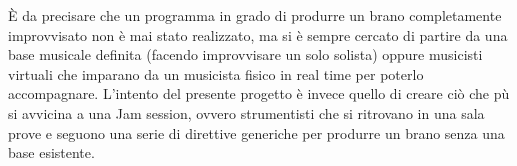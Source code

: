 È da precisare che un programma in grado di produrre un brano completamente improvvisato non è mai stato realizzato, ma si è sempre cercato di partire da una base musicale definita (facendo improvvisare un solo solista) oppure musicisti virtuali che imparano da un musicista fisico in real time per poterlo accompagnare.
L'intento del presente progetto è invece quello di creare ciò che pù si avvicina a una Jam session, ovvero strumentisti che si ritrovano in una sala prove e seguono una serie di direttive generiche per produrre un brano senza una base esistente.
